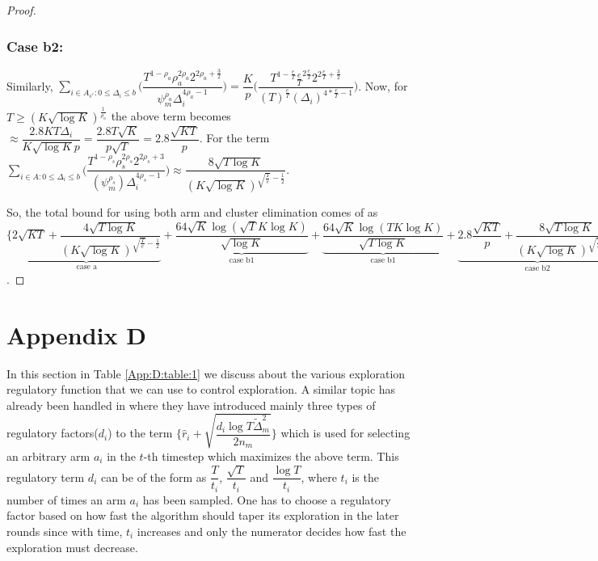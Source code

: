 \begin{proof}
\subsubsection{Case b2:}
\par Similarly, $\sum\limits_{i\in A_{s^{*}}:0\leq\Delta_{i}\leq b}\bigg(\dfrac{T^{1-\rho_{a}}\rho_{a}^{2\rho_{a}}2^{2\rho_{a}+\frac{3}{2}}}{\psi_{m}^{\rho_{a}}\Delta_{i}^{4\rho_{a}-1}} \bigg)=\dfrac{K}{p}\bigg(\dfrac{T^{1-\frac{e}{T}}\frac{e}{T}^{2\frac{e}{T}}2^{2\frac{e}{T}+\frac{3}{2}}}{{(T)^{\frac{e}{T}}}{(\Delta_{i})^{4*\frac{e}{T}-1}}} \bigg) $. Now, for $T\geq (K\sqrt{\log K})^{\frac{1}{\rho_{a}}}$ the above term becomes $\approx \dfrac{2.8KT\Delta_{i}}{K\sqrt{\log K}p}=\dfrac{2.8T\sqrt{K}}{p\sqrt{T}}= 2.8\dfrac{\sqrt{KT}}{p}$. For the term $\sum\limits_{i\in A:0\leq\Delta_{i}\leq b}\bigg(\dfrac{T^{1-\rho_{s}}\rho_{s}^{2\rho_{s}}2^{2\rho_{s}+3}}{(\psi_{m}^{\rho_{s}})\Delta_{i}^{4\rho_{s} -1}} \bigg)\approx \dfrac{8\sqrt{T\log K}}{(K\sqrt{\log K})^{\sqrt{\frac{T}{e}}-\frac{1}{2}}}$.

So, the total bound for using both arm and cluster elimination comes of as $\bigg\lbrace \underbrace{2\sqrt{KT} + \dfrac{4\sqrt{T\log K}}{(K\sqrt{\log K})^{\sqrt{\frac{T}{e}}-\frac{1}{2}}}}_{\text{case a}} + \underbrace{\dfrac{64\sqrt{K}\log{(\sqrt{T}K\log K)}}{\sqrt{\log K}}}_{\text{case b1}} + \underbrace{\dfrac{64\sqrt{K}\log{(TK\log K)}}{\sqrt{T\log K}}}_{\text{case b1}} + \underbrace{2.8\dfrac{\sqrt{KT}}{p} + \dfrac{8\sqrt{T\log K}}{(K\sqrt{\log K})^{\sqrt{\frac{T}{e}}-\frac{1}{2}}}}_{\text{case b2}} \bigg\rbrace$.
\end{proof}


\section{Appendix D}
\label{App:D}
In this section in Table \ref{App:D:table:1} we discuss about the various exploration regulatory function that we can use to control exploration. A similar topic has already been handled in \cite{liu2016modification} where they have introduced mainly three types of regulatory factors($d_{i}$) to the term $\bigg\lbrace\hat{r}_{i}+\sqrt{\dfrac{d_{i}\log T\tilde{\Delta}_{m}^{2}}{2n_{m}}}\bigg\rbrace$ which is used for selecting an arbitrary arm $a_{i}$ in the $t$-th timestep which maximizes the above term. This regulatory term $d_{i}$ can be of the form as $\dfrac{T}{t_{i}}$, $\dfrac{\sqrt{T}}{t_{i}}$ and $\dfrac{\log T}{t_{i}}$, where $t_{i}$ is the number of times an arm $a_{i}$ has been sampled. One has to choose a regulatory factor based on how fast the algorithm should taper its exploration in the later rounds since with time, $t_{i}$ increases and only the numerator decides how fast the exploration must decrease.

